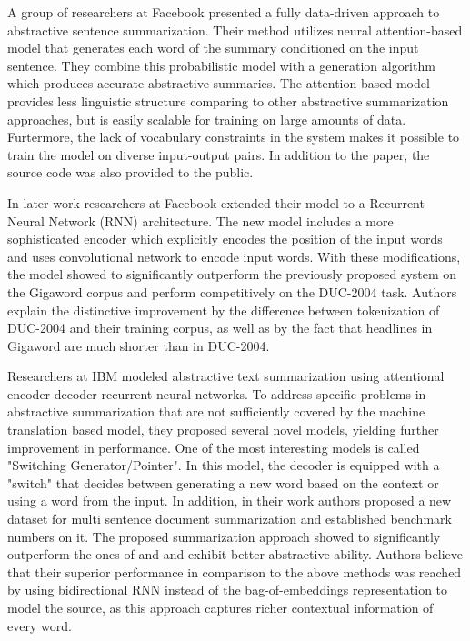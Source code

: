 \documentclass[11pt,a4paper,onecolumn]{article}
\begin{document}
A group of researchers at Facebook \cite{rush2015neural} presented a fully data-driven approach to abstractive sentence summarization.
Their method utilizes neural attention-based model that generates each word of the summary conditioned on the input sentence.
They combine this probabilistic model with a generation algorithm which produces accurate abstractive summaries.
The attention-based model provides less linguistic structure comparing to other abstractive summarization approaches, but is easily scalable for training on large amounts of data.
Furtermore, the lack of vocabulary constraints in the system makes it possible to train the model on diverse input-output pairs.
In addition to the paper, the source code \cite{Namas2015Facebook} was also provided to the public.

In later work \cite{chopra2016abstractive} researchers at Facebook extended their model to a Recurrent Neural Network (RNN) architecture.
The new model includes a more sophisticated encoder which explicitly encodes the position of the input words and uses convolutional network to encode input words.
With these modifications, the model showed to significantly outperform the previously proposed system on the Gigaword corpus and perform competitively on the DUC-2004 task.
Authors explain the distinctive improvement by the difference between tokenization of DUC-2004 and their training corpus, as well as by the fact that headlines in Gigaword are much shorter than in DUC-2004.

Researchers at IBM \cite{nallapati2016abstractive} modeled abstractive text summarization using attentional encoder-decoder recurrent neural networks.
To address specific problems in abstractive summarization that are not sufficiently covered by the machine translation based model, they proposed several novel models, yielding further improvement in performance.
One of the most interesting models is called "Switching Generator/Pointer". In this model, the decoder is equipped with a "switch" that decides between generating a new word based on the context or using a word from the input.
In addition, in their work authors proposed a new dataset for multi sentence document summarization and established benchmark numbers on it.
The proposed summarization approach showed to significantly outperform the ones of \cite{rush2015neural} and \cite{chopra2016abstractive} and exhibit better abstractive ability.
Authors believe that their superior performance in comparison to the above methods was reached by using bidirectional RNN instead of the bag-of-embeddings representation to model the source, as this approach captures richer contextual information of every word.
\end{document}
